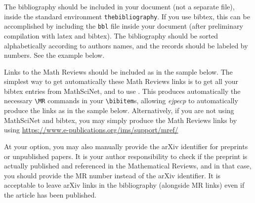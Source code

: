 \documentclass[ECP]{ejpecp} %
\begin{document}
The bibliography should be included in your document (not a separate file),
inside the standard environment \verb+thebibliography+. If you use bibtex,
this can be accomplished by including the \texttt{bbl} file inside your
document (after preliminary compilation with latex and bibtex). The
bibliography should be sorted alphabetically according to authors names, and
the records should be labeled by numbers. See the example below.

Links to the Math Reviews should be included as in the sample below. The
simplest way to get automatically these Math Reviews links is to get all your
bibtex entries from MathSciNet, and to use
\verb++. This produces automatically the necessary
\verb+\MR+ commands in your \verb+\bibitem+s, allowing \emph{ejpecp} to
automatically produce the links as in the sample below. Alternatively, if you
are not using MathSciNet and bibtex, you may simply produce the Math Reviews
links by using
\url{https://www.e-publications.org/ims/support/mref/}

At your option, you may also manually provide the arXiv identifier for
preprints or unpublished papers. It is your author responsibility to check if
the preprint is actually published and referenced in the Mathematical Reviews,
and in that case, you should provide the MR number instead of the arXiv
identifier. It is acceptable to leave arXiv links in the bibliography
(alongside MR links) even if the article has been published.



%
%

\end{document}
